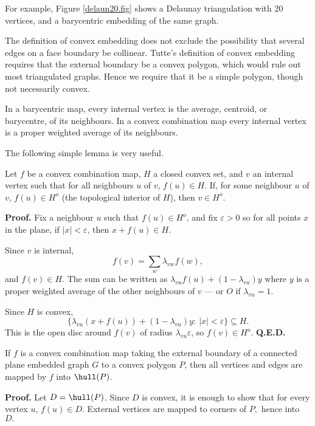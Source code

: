 For example, Figure \ref{delaun20.fig} shows a Delaunay triangulation
with 20 vertices, and a barycentric embedding of the same graph.

The definition of convex embedding does not exclude the
possibility that several edges on a face boundary be collinear.
Tutte's definition of convex embedding
\cite{tutte60} requires that the external boundary
be a convex polygon, which would rule out most triangulated
graphs.  Hence we require that it be a simple
polygon, though not necessarily convex.

In a barycentric map, every internal vertex is the average, centroid,
or barycentre, of its neighbours.  In a convex combination map
every internal vertex is a proper weighted average of its
neighbours.

The following simple lemma is very useful.

\begin{lemma}
\label{lem: one-sided}
Let $f$ be a convex combination map, $H$ a closed convex
set, and $v$ an internal vertex such that
for all neighbours $u$ of $v$, $f(u)\in H$.
If, for some neighbour $u$ of $v$, $f(u)\in H^o$ (the topological interior
of $H$), then $v \in H^o$.
\end{lemma}

{\bf Proof.} Fix a neighbour $u$ such that $f(u)\in H^o$,
and fix $\varepsilon > 0$ so for all points $x$ in the
plane, if $|x|<\varepsilon$, then $x+f(u)\in H$.

Since $v$ is internal,
$$ f(v) = \sum_w \lambda_{vw} f(w),$$  and $f(v)\in H$.
The sum can be written
as $\lambda_{vu} f(u) + (1-\lambda_{vu})y$  where $y$ is
a proper weighted average of the other neighbours of $v$ --- or
$O$ if $\lambda_{vu}=1$.

Since $H$ is convex,
$$ \{ \lambda_{vu}(x+f(u)) + (1-\lambda_{vu})y:~ |x| < \varepsilon \}
\subseteq H.$$ This is the open disc around $f(v)$ of
radius $\lambda_{vu}\varepsilon$, so $f(v)\in H^o$. {\bf Q.E.D.}\medskip

\begin{lemma}
\label{convex combination map inside P} If $f$ is a convex combination map taking the external boundary
of a connected plane embedded graph $G$ to a convex polygon $P$,
then all vertices and edges are mapped by $f$ into $\hull(P)$.
\end{lemma}

{\bf Proof.}
Let $D=\hull(P)$.
Since $D$ is convex, it is enough to show that for every
vertex $u$, $f(u)\in D.$  External vertices are mapped
to corners of $P,$ hence into $D.$

